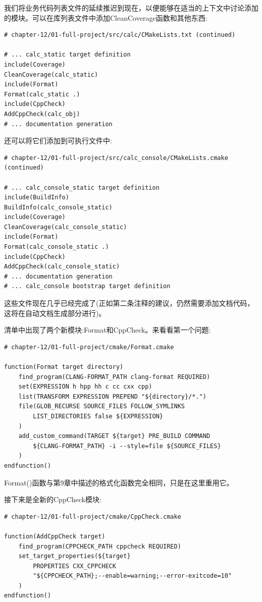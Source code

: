 
我们将业务代码列表文件的延续推迟到现在，以便能够在适当的上下文中讨论添加的模块。可以在库列表文件中添加CleanCoverage函数和其他东西:

\begin{lstlisting}[style=styleCMake]
# chapter-12/01-full-project/src/calc/CMakeLists.txt (continued)

# ... calc_static target definition
include(Coverage)
CleanCoverage(calc_static)
include(Format)
Format(calc_static .)
include(CppCheck)
AddCppCheck(calc_obj)
# ... documentation generation
\end{lstlisting}

还可以将它们添加到可执行文件中:

\begin{lstlisting}[style=styleCMake]
# chapter-12/01-full-project/src/calc_console/CMakeLists.cmake (continued)

# ... calc_console_static target definition
include(BuildInfo)
BuildInfo(calc_console_static)
include(Coverage)
CleanCoverage(calc_console_static)
include(Format)
Format(calc_console_static .)
include(CppCheck)
AddCppCheck(calc_console_static)
# ... documentation generation
# ... calc_console bootstrap target definition
\end{lstlisting}

这些文件现在几乎已经完成了(正如第二条注释的建议，仍然需要添加文档代码，这将在自动文档生成部分进行)。

清单中出现了两个新模块:Format和CppCheck。来看看第一个问题:

\begin{lstlisting}[style=styleCMake]
# chapter-12/01-full-project/cmake/Format.cmake

function(Format target directory)
	find_program(CLANG-FORMAT_PATH clang-format REQUIRED)
	set(EXPRESSION h hpp hh c cc cxx cpp)
	list(TRANSFORM EXPRESSION PREPEND "${directory}/*.")
	file(GLOB_RECURSE SOURCE_FILES FOLLOW_SYMLINKS
		LIST_DIRECTORIES false ${EXPRESSION}
	)
	add_custom_command(TARGET ${target} PRE_BUILD COMMAND
		${CLANG-FORMAT_PATH} -i --style=file ${SOURCE_FILES}
	)
endfunction()
\end{lstlisting}

Format()函数与第9章中描述的格式化函数完全相同，只是在这里重用它。

接下来是全新的CppCheck模块:

\begin{lstlisting}[style=styleCMake]
# chapter-12/01-full-project/cmake/CppCheck.cmake

function(AddCppCheck target)
	find_program(CPPCHECK_PATH cppcheck REQUIRED)
	set_target_properties(${target}
		PROPERTIES CXX_CPPCHECK
		"${CPPCHECK_PATH};--enable=warning;--error-exitcode=10"
	)
endfunction()
\end{lstlisting}

